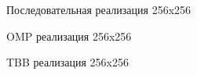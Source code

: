 \documentclass{report}
\begin{document}
\begin{figure}[H]
\caption{Последовательная реализация 256x256}
\end{figure}

\begin{figure}[H]
\caption{OMP реализация 256x256}
\end{figure}

\begin{figure}[H]
\caption{TBB реализация 256x256}
\end{figure}
\end{document}
